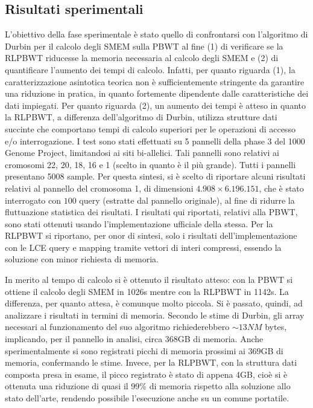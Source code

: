 \documentclass[a4paper,11pt, oneside,italian]{article}
\begin{document}
\subsection*{Risultati sperimentali}
L'obiettivo della fase sperimentale è stato quello di confrontarsi con
l'algoritmo di Durbin per il calcolo degli SMEM sulla PBWT al fine 
(1) di verificare se la RLPBWT riducesse la memoria necessaria al calcolo degli
SMEM e (2) di quantificare l'aumento dei tempi di calcolo.
Infatti, per quanto riguarda (1), la caratterizzazione asintotica teorica non è
sufficientemente stringente da garantire una riduzione in pratica, in quanto
fortemente dipendente dalle caratteristiche dei dati impiegati.
Per quanto riguarda (2), un aumento dei tempi è atteso in quanto la RLPBWT,
a differenza dell'algoritmo di Durbin, utilizza strutture dati succinte che
comportano tempi di calcolo superiori per le operazioni di accesso e/o
interrogazione. 
I test sono stati effettuati su 5 pannelli della phase 3 del 1000 Genome
Project, limitandosi 
ai siti bi-allelici. Tali pannelli sono relativi ai cromosomi 22, 20, 18, 16 e 1
(scelto in quanto è il più grande). Tutti i pannelli presentano 5008 sample.
Per questa sintesi, si è scelto di riportare alcuni risultati relativi al
pannello del cromosoma 1, di dimensioni $4.908 \times 6.196.151$, che è stato
interrogato con $100$ query (estratte dal pannello originale), al 
fine di ridurre la fluttuazione statistica dei risultati.
I risultati qui riportati, relativi alla PBWT, sono stati ottenuti usando
l'implementazione ufficiale della stessa. Per la RLPBWT si riportano, per onor
di sintesi, solo i
risultati dell'implementazione con le LCE query e mapping tramite vettori di
interi compressi, essendo la soluzione con minor richiesta di memoria. 

In merito al tempo di calcolo si è ottenuto il risultato atteso: con
la PBWT si ottiene il calcolo degli SMEM in 1026s
mentre con la RLPBWT in 1142s. La differenza, per quanto attesa, è comunque
molto piccola.
Si è passato, quindi, ad analizzare i risultati in termini di memoria. Secondo
le stime di Durbin, gli array necessari al funzionamento del suo algoritmo
richiederebbero $\sim13NM$ bytes, implicando, per il pannello in analisi, circa
368GB di memoria. 
Anche sperimentalmente si sono registrati
picchi di memoria prossimi ai 369GB di memoria, confermando le stime. Invece,
per la RLPBWT, con la struttura dati composta presa in esame, il picco
registrato è stato di appena 4GB, 
cioè si è ottenuta una riduzione di quasi il 99\% di memoria rispetto alla
soluzione allo stato dell'arte, rendendo possibile l'esecuzione anche su un
comune portatile. 
\end{document}
